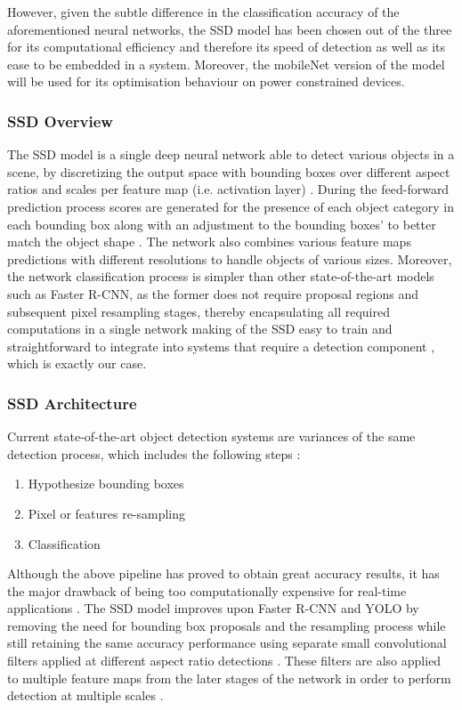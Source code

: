 However, given the subtle difference in the classification accuracy of the aforementioned neural networks, the SSD model has been chosen out of the three for its computational efficiency and therefore its speed of detection as well as its ease to be embedded in a system. Moreover, the mobileNet version of the model will be used for its optimisation behaviour on power constrained devices.

\subsubsection{SSD Overview}

The SSD model is a single deep neural network able to detect various objects in a scene, by discretizing the output space with bounding boxes over different aspect ratios and scales per feature map (i.e. activation layer) \cite{paper:SSD}. During the feed-forward prediction process scores are generated for the presence of each object category in each bounding box along with an adjustment to the bounding boxes' to better match the object shape \cite{paper:SSD}. The network also combines various feature maps predictions with different resolutions to handle objects of various sizes. Moreover, the network classification process is simpler than other state-of-the-art models such as Faster R-CNN, as the former does not require proposal regions and subsequent pixel resampling stages, thereby encapsulating all required computations in a single network making of the SSD easy to train and straightforward to integrate into systems that require a detection component \cite{paper:SSD}, which is exactly our case.

\subsubsection{SSD Architecture}

Current state-of-the-art object detection systems are variances of the same detection process, which includes the following steps \cite{paper:SSD}:

\begin{enumerate}
  \item Hypothesize bounding boxes
  \item Pixel or features re-sampling
  \item Classification
\end{enumerate}

Although the above pipeline has proved to obtain great accuracy results, it has the major drawback of being too computationally expensive for real-time applications \cite{paper:SSD}. The SSD model improves upon Faster R-CNN \cite{paper:FRCNN} and YOLO \cite{paper:YOLO} by removing the need for bounding box proposals and the resampling process while still retaining the same accuracy performance using separate small convolutional filters applied at different aspect ratio detections \cite{paper:SSD}. These  filters are also applied to multiple feature maps from the later stages of the network in order to perform detection at multiple scales \cite{paper:SSD}.

